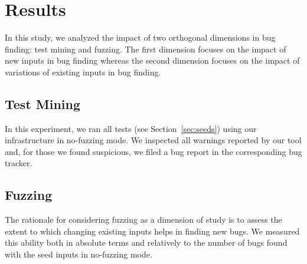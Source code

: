 \documentclass[10pt,conference,anonymous]{IEEEtran}
\begin{document}
\section{Results}
\label{sec:results}

In this study, we analyzed the impact of two orthogonal dimensions in
bug finding: test mining and fuzzing. The first dimension focuses on
the impact of new inputs in bug finding whereas the second dimension
focuses on the impact of variations of existing inputs in bug finding.

\subsection{Test Mining}

In this experiment, we ran all tests (see Section~\ref{sec:seeds})
using our infrastructure in no-fuzzing mode. We inspected all warnings
reported by our tool and, for those we found suspicious, we filed a
bug report in the corresponding bug tracker.





\subsection{Fuzzing}

The rationale for considering fuzzing as a dimension of study is to
assess the extent to which changing existing inputs helps in finding
new bugs. We measured this ability both in absolute terms and
relatively to the number of bugs found with the seed inputs in
no-fuzzing mode.
\end{document}
